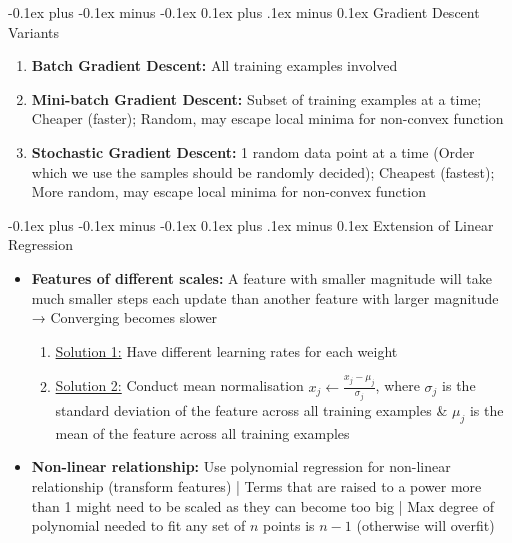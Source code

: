 \documentclass[landscape]{article}
\makeatletter
\renewcommand{\subsection}{\@startsection{subsection}{2}{0mm}%
  {-0.1ex plus -0.1ex minus -0.1ex}%
  {0.1ex plus .1ex minus 0.1ex}%
{\normalfont\scriptsize\bfseries}}
\makeatother
\begin{document}
\begin{multicols*}{5}
        \subsection{Gradient Descent Variants}
        \begin{enumerate}
          \item \textbf{Batch Gradient Descent:} All training examples involved
          \item \textbf{Mini-batch Gradient Descent:} Subset of training examples at a time; Cheaper (faster); Random, may escape local minima for non-convex function
          \item \textbf{Stochastic Gradient Descent:} 1 random data point at a time (Order which we use the samples should be randomly decided); Cheapest (fastest); More random, may escape local minima for non-convex function
        \end{enumerate}

        \subsection{Extension of Linear Regression}
        \begin{itemize}
          \item \textbf{Features of different scales:} A feature with smaller magnitude will take much smaller steps each update than another feature with larger magnitude → Converging becomes slower
          \begin{enumerate}
            \item \underline{Solution 1:} Have different learning rates for each weight
            \item \underline{Solution 2:} Conduct mean normalisation $x_j \leftarrow \frac{x_j-\mu_j}{\sigma_j}$, where $\sigma_j$ is the standard deviation of the feature across all training examples \& $\mu_j$ is the mean of the feature across all training examples
          \end{enumerate}
          \item \textbf{Non-linear relationship:} Use polynomial regression for non-linear relationship (transform features) | Terms that are raised to a power more than 1 might need to be scaled as they can become too big | Max degree of polynomial needed to fit any set of $n$ points is $n-1$ (otherwise will overfit)
        \end{itemize}


\end{multicols*}
\end{document}
